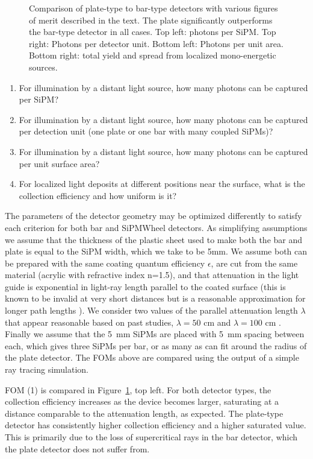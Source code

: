 \begin{figure}[t!]
\caption{Comparison of plate-type to bar-type detectors with various figures of merit described in the text.  The plate significantly outperforms the bar-type detector in all cases. Top left: photons per SiPM. Top right: Photons per detector unit. Bottom left: Photons per unit area. Bottom right: total yield and spread from localized mono-energetic sources. \label{fig:FOMs}}
\end{figure}



\begin{enumerate}
\item For illumination by a distant light source, how many photons can be captured per SiPM?  
\item For illumination by a distant light source, how many photons can be captured per detection unit (one plate or one bar with many coupled SiPMs)?  
\item For illumination by a distant light source, how many photons can be captured per unit surface area?  
\item For localized light deposits at different positions near the surface, what is the collection efficiency and how uniform is it?
\end{enumerate}

The parameters of the detector geometry may be optimized differently to satisfy each criterion for both bar and SiPMWheel detectors.  As simplifying assumptions we assume that the thickness of the plastic sheet used to make both the bar and plate is equal to the SiPM width, which we take to be 5mm.  We assume both can be prepared with the same coating quantum efficiency $\epsilon$, are cut from the same material (acrylic with refractive index n=1.5), and that attenuation in the light guide is exponential in light-ray length parallel to the coated surface (this is known to be invalid at very short distances but is a reasonable approximation for longer path lengths \cite{Jones:2013sfa}).  We consider two values of the parallel attenuation length $\lambda$ that appear reasonable based on past studies, $\lambda=50$ cm and $\lambda=100$ cm \cite{Moss:2014ota,Jones:2013sfa}.  Finally we assume that the 5~mm SiPMs are placed with 5~mm spacing between each, which gives three SiPMs per bar, or as many as can fit around the radius of the plate detector.  The FOMs above are compared using the output of a simple ray tracing simulation.

FOM (1) is compared in Figure~\ref{fig:FOMs}, top left.   For both detector types, the collection efficiency increases as the device becomes larger, saturating at a distance comparable to the attenuation length, as expected.   The plate-type detector has consistently higher collection efficiency and a higher saturated value.  This is primarily due to the loss of supercritical rays in the bar detector, which the plate detector does not suffer from.

